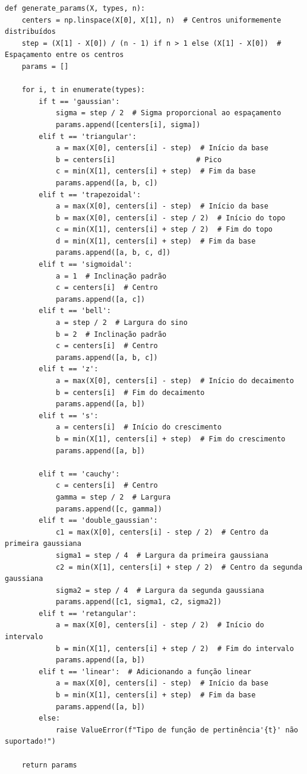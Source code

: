 \documentclass[a4paper,12pt]{article}
\begin{document}
\begin{verbatim}
def generate_params(X, types, n):
    centers = np.linspace(X[0], X[1], n)  # Centros uniformemente distribuídos
    step = (X[1] - X[0]) / (n - 1) if n > 1 else (X[1] - X[0])  # Espaçamento entre os centros
    params = []

    for i, t in enumerate(types):
        if t == 'gaussian':
            sigma = step / 2  # Sigma proporcional ao espaçamento
            params.append([centers[i], sigma])
        elif t == 'triangular':
            a = max(X[0], centers[i] - step)  # Início da base
            b = centers[i]                   # Pico
            c = min(X[1], centers[i] + step)  # Fim da base
            params.append([a, b, c])
        elif t == 'trapezoidal':
            a = max(X[0], centers[i] - step)  # Início da base
            b = max(X[0], centers[i] - step / 2)  # Início do topo
            c = min(X[1], centers[i] + step / 2)  # Fim do topo
            d = min(X[1], centers[i] + step)  # Fim da base
            params.append([a, b, c, d])
        elif t == 'sigmoidal':
            a = 1  # Inclinação padrão
            c = centers[i]  # Centro
            params.append([a, c])
        elif t == 'bell':
            a = step / 2  # Largura do sino
            b = 2  # Inclinação padrão
            c = centers[i]  # Centro
            params.append([a, b, c])
        elif t == 'z':
            a = max(X[0], centers[i] - step)  # Início do decaimento
            b = centers[i]  # Fim do decaimento
            params.append([a, b])
        elif t == 's':
            a = centers[i]  # Início do crescimento
            b = min(X[1], centers[i] + step)  # Fim do crescimento
            params.append([a, b])
       
        elif t == 'cauchy':
            c = centers[i]  # Centro
            gamma = step / 2  # Largura
            params.append([c, gamma])
        elif t == 'double_gaussian':
            c1 = max(X[0], centers[i] - step / 2)  # Centro da primeira gaussiana
            sigma1 = step / 4  # Largura da primeira gaussiana
            c2 = min(X[1], centers[i] + step / 2)  # Centro da segunda gaussiana
            sigma2 = step / 4  # Largura da segunda gaussiana
            params.append([c1, sigma1, c2, sigma2])
        elif t == 'retangular':
            a = max(X[0], centers[i] - step / 2)  # Início do intervalo
            b = min(X[1], centers[i] + step / 2)  # Fim do intervalo
            params.append([a, b])
        elif t == 'linear':  # Adicionando a função linear
            a = max(X[0], centers[i] - step)  # Início da base
            b = min(X[1], centers[i] + step)  # Fim da base
            params.append([a, b])
        else:
            raise ValueError(f"Tipo de função de pertinência'{t}' não suportado!")
    
    return params
\end{verbatim}
\end{document}
